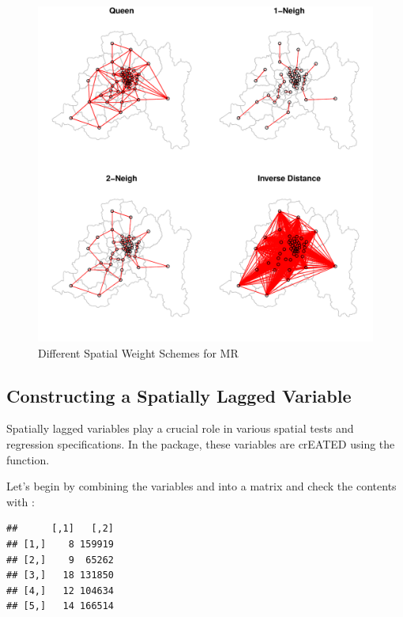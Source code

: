 \begin{figure}[h!]
  \caption{Different Spatial Weight Schemes for MR}
    \label{fig:more_ws}
\begin{knitrout}
\color{fgcolor}

{\centering \includegraphics[width=\maxwidth]{figure/plot-all-wsT-1} 

}


\end{knitrout}
\end{figure}

\subsection{Constructing a Spatially Lagged Variable}

Spatially lagged variables play a crucial role in various spatial tests and regression specifications. In the  package, these variables are crEATED using the   function.

Let's begin by combining the variables   and  into a matrix and check the contents with :
\begin{knitrout}
\color{fgcolor}\begin{kframe}
\begin{alltt}
 \hlkwb{<-} \hlopt{$}\hlopt{$}
 \hldef{)}
\end{alltt}
\begin{verbatim}
##      [,1]   [,2]
## [1,]    8 159919
## [2,]    9  65262
## [3,]   18 131850
## [4,]   12 104634
## [5,]   14 166514
\end{verbatim}
\end{kframe}
\end{knitrout}

